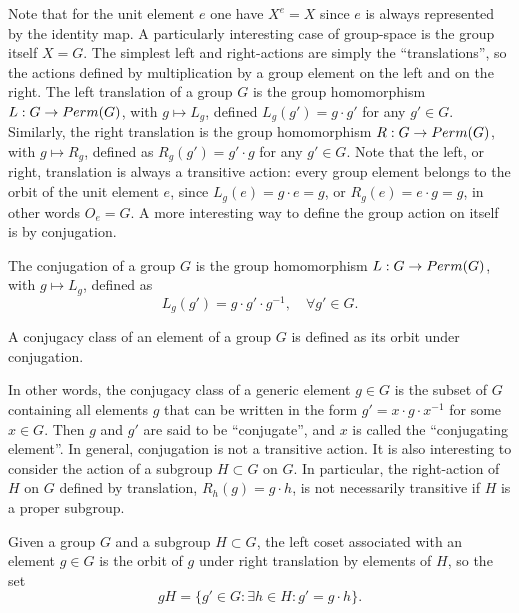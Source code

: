 Note that for the unit element $e$ one have $X^e = X$ since $e$ is always represented by the identity map. A particularly interesting case of group-space is the group itself $X = G$. The simplest left and right-actions are simply the ``translations'', so the actions defined by multiplication by a group element on the left and on the right. The left translation of a group $G$ is the group homomorphism $L : G \to {Perm}(G)$, with $g \mapsto L_g$, defined $L_g(g') = g\cdot g'$ for any $g' \in G$. Similarly, the right translation is the group homomorphism $R : G \to {Perm}(G)$, with $g \mapsto R_g$, defined as $R_g(g') = g'\cdot g$ for any $g' \in G$. Note that the left, or right, translation is always a transitive action: every group element belongs to the orbit of the unit element $e$, since $L_g(e) = g \cdot e = g$, or $R_g(e) = e \cdot g = g$, in other words $O_e = G$. A more interesting way to define the group action on itself is by conjugation.
\begin{defn}[conjugation]
    The conjugation of a group $G$ is the group homomorphism $L : G \to {Perm}(G)$, with $g \mapsto L_g$, defined as
    \begin{equation}
        L_g(g') = g\cdot g' \cdot g^{-1},\quad \forall g' \in G.
    \end{equation}
\end{defn}
\begin{defn}
    A conjugacy class of an element of a group $G$ is defined as its orbit under conjugation.
\end{defn}
In other words, the conjugacy class of a generic element $g \in G$ is the subset of $G$ containing all elements $g$ that can be written in the form $g' = x \cdot g \cdot x^{-1}$ for some $x \in G$. Then $g$ and $g'$ are said to be ``conjugate'', and $x$ is called the ``conjugating element''. In general, conjugation is not a transitive action. It is also interesting to consider the action of a subgroup $H \subset G$ on $G$. In particular, the right-action of $H$ on $G$ defined by translation, $R_h(g) = g \cdot h$, is not necessarily transitive if $H$ is a proper subgroup. 
\begin{defn}
    Given a group $G$ and a subgroup $H \subset G$, the left coset associated with an element $g \in G$ is the orbit of $g$ under right translation by elements of $H$, so the set 
    \begin{equation}
        gH = \{g' \in G : \exists h \in H : g' = g \cdot h\}.
    \end{equation}
\end{defn}
